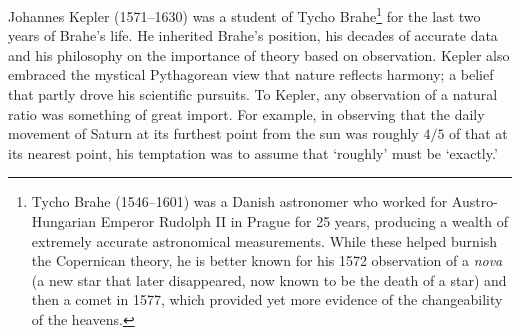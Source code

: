 \label{pg:keplerslaws}

Johannes Kepler (1571--1630) was a student of Tycho Brahe\footnote{Tycho Brahe (1546--1601) was a Danish astronomer who worked for Austro-Hungarian Emperor Rudolph II in Prague for 25 years, producing a wealth of extremely accurate astronomical measurements. While these helped burnish the Copernican theory, he is better known for his 1572 observation of a \emph{nova} (a new star that later disappeared, now known to be the death of a star) and then a comet in 1577, which provided yet more evidence of the changeability of the heavens.} for the last two years of Brahe's life. He inherited Brahe's position, his decades of accurate data and his philosophy on the importance of theory based on observation. Kepler also embraced the mystical Pythagorean view that nature reflects harmony; a belief that partly drove his scientific pursuits. To Kepler, any observation of a natural ratio was something of great import. For example, in observing that the daily movement of Saturn at its furthest point from the sun was roughly $4/5$ of that at its nearest point, his temptation was to assume that `roughly' must be `exactly.'\par

